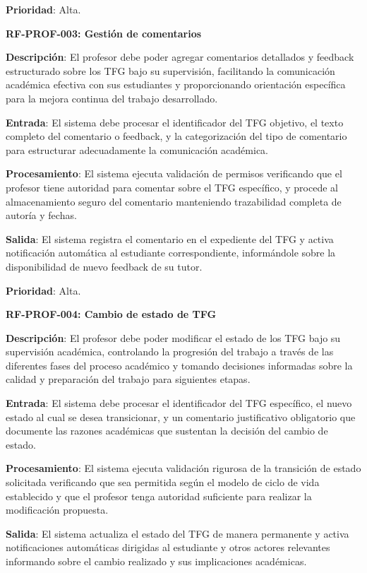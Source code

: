 \documentclass[12pt,a4paper,oneside]{report}
\begin{document}
\textbf{Prioridad}: Alta.

\textbf{RF-PROF-003: Gestión de comentarios}

\textbf{Descripción}: El profesor debe poder agregar comentarios detallados y feedback estructurado sobre los TFG bajo su supervisión, facilitando la comunicación académica efectiva con sus estudiantes y proporcionando orientación específica para la mejora continua del trabajo desarrollado.

\textbf{Entrada}: El sistema debe procesar el identificador del TFG objetivo, el texto completo del comentario o feedback, y la categorización del tipo de comentario para estructurar adecuadamente la comunicación académica.

\textbf{Procesamiento}: El sistema ejecuta validación de permisos verificando que el profesor tiene autoridad para comentar sobre el TFG específico, y procede al almacenamiento seguro del comentario manteniendo trazabilidad completa de autoría y fechas.

\textbf{Salida}: El sistema registra el comentario en el expediente del TFG y activa notificación automática al estudiante correspondiente, informándole sobre la disponibilidad de nuevo feedback de su tutor.

\textbf{Prioridad}: Alta.

\textbf{RF-PROF-004: Cambio de estado de TFG}

\textbf{Descripción}: El profesor debe poder modificar el estado de los TFG bajo su supervisión académica, controlando la progresión del trabajo a través de las diferentes fases del proceso académico y tomando decisiones informadas sobre la calidad y preparación del trabajo para siguientes etapas.

\textbf{Entrada}: El sistema debe procesar el identificador del TFG específico, el nuevo estado al cual se desea transicionar, y un comentario justificativo obligatorio que documente las razones académicas que sustentan la decisión del cambio de estado.

\textbf{Procesamiento}: El sistema ejecuta validación rigurosa de la transición de estado solicitada verificando que sea permitida según el modelo de ciclo de vida establecido y que el profesor tenga autoridad suficiente para realizar la modificación propuesta.

\textbf{Salida}: El sistema actualiza el estado del TFG de manera permanente y activa notificaciones automáticas dirigidas al estudiante y otros actores relevantes informando sobre el cambio realizado y sus implicaciones académicas.
\end{document}
